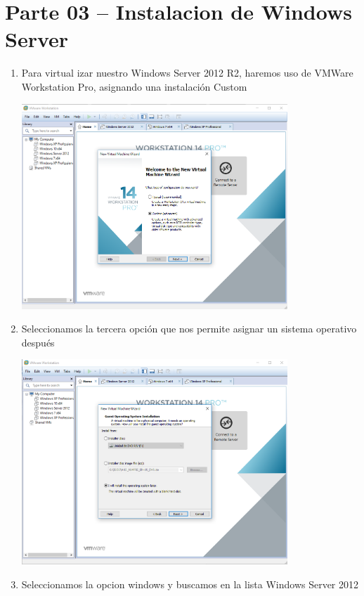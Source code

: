 \section{Parte 03 – Instalacion de Windows Server} 

\begin{enumerate}[1.]
	\item Para virtual izar nuestro Windows Server 2012 R2, haremos uso de VMWare Workstation Pro, asignando una instalación Custom

	\begin{center}
	\includegraphics[width=10cm]{./Imagenes/img1server} 
	\end{center}
	
	\item Seleccionamos la tercera opción que nos permite asignar un sistema operativo después

	\begin{center}
	\includegraphics[width=10cm]{./Imagenes/img2server} 
	\end{center}

	\hfill \break
	\hfill \break
	\hfill \break
	\hfill \break
	\hfill \break
	\item Seleccionamos la opcion windows y buscamos en la lista Windows Server 2012


\end{enumerate}
